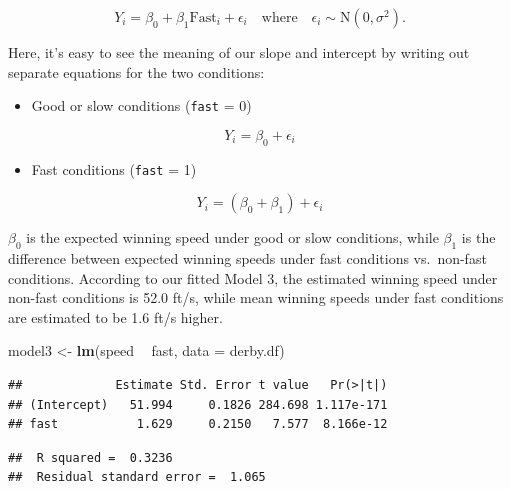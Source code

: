 \documentclass[
]{krantz}
\newenvironment{Shaded}{\begin{snugshade}}{\end{snugshade}}
\newcommand{\DataTypeTok}[1]{\textcolor[rgb]{0.27,0.27,0.27}{#1}}
\newcommand{\KeywordTok}[1]{\textcolor[rgb]{0.27,0.27,0.27}{\textbf{#1}}}
\newcommand{\NormalTok}[1]{#1}
\newcommand{\OperatorTok}[1]{\textcolor[rgb]{0.43,0.43,0.43}{\textbf{#1}}}
\newcommand{\StringTok}[1]{\textcolor[rgb]{0.5,0.5,0.5}{#1}}
\providecommand{\tightlist}{%
  \setlength{\itemsep}{0pt}\setlength{\parskip}{0pt}}
\begin{document}
\begin{equation}
Y_{i}=\beta_{0}+\beta_{1}\textrm{Fast}_{i}+\epsilon_{i}\quad \textrm{where}\quad \epsilon_{i}\sim \textrm{N}(0,\sigma^2).
\label{eq:model3}
\end{equation}

Here, it's easy to see the meaning of our slope and intercept by writing out separate equations for the two conditions:

\begin{itemize}
\tightlist
\item
  Good or slow conditions (\texttt{fast} = 0)
\end{itemize}

\begin{equation*}
Y_{i} = \beta_{0}+\epsilon_{i}
\end{equation*}

\begin{itemize}
\tightlist
\item
  Fast conditions (\texttt{fast} = 1)
\end{itemize}

\begin{equation*}
Y_{i} = (\beta_{0}+\beta_{1})+\epsilon_{i}
\end{equation*}

\(\beta_{0}\) is the expected winning speed under good or slow conditions, while \(\beta_{1}\) is the difference between expected winning speeds under fast conditions vs.~non-fast conditions. According to our fitted Model 3, the estimated winning speed under non-fast conditions is 52.0 ft/s, while mean winning speeds under fast conditions are estimated to be 1.6 ft/s higher.

\begin{Shaded}
\begin{Highlighting}[]
\NormalTok{model3 <-}\StringTok{ }\KeywordTok{lm}\NormalTok{(speed }\OperatorTok{~}\StringTok{ }\NormalTok{fast, }\DataTypeTok{data =}\NormalTok{ derby.df)}
\end{Highlighting}
\end{Shaded}

\begin{verbatim}
##             Estimate Std. Error t value   Pr(>|t|)
## (Intercept)   51.994     0.1826 284.698 1.117e-171
## fast           1.629     0.2150   7.577  8.166e-12
\end{verbatim}

\begin{verbatim}
##  R squared =  0.3236 
##  Residual standard error =  1.065
\end{verbatim}
\end{document}
